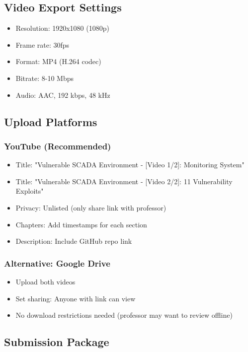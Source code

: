 \documentclass[12pt,a4paper]{article}
\begin{document}
\subsection{Video Export Settings}

\begin{itemize}[leftmargin=*]
    \item Resolution: 1920x1080 (1080p)
    \item Frame rate: 30fps
    \item Format: MP4 (H.264 codec)
    \item Bitrate: 8-10 Mbps
    \item Audio: AAC, 192 kbps, 48 kHz
\end{itemize}

\subsection{Upload Platforms}

\subsubsection{YouTube (Recommended)}
\begin{itemize}[leftmargin=*]
    \item Title: "Vulnerable SCADA Environment - [Video 1/2]: Monitoring System"
    \item Title: "Vulnerable SCADA Environment - [Video 2/2]: 11 Vulnerability Exploits"
    \item Privacy: Unlisted (only share link with professor)
    \item Chapters: Add timestamps for each section
    \item Description: Include GitHub repo link
\end{itemize}

\subsubsection{Alternative: Google Drive}
\begin{itemize}[leftmargin=*]
    \item Upload both videos
    \item Set sharing: Anyone with link can view
    \item No download restrictions needed (professor may want to review offline)
\end{itemize}

\subsection{Submission Package}
\end{document}
